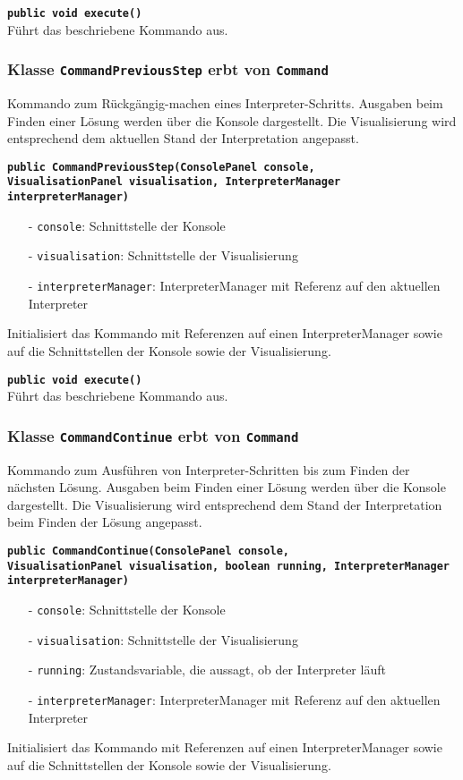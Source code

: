 \documentclass[parskip=full,11pt,twoside]{scrartcl}
\begin{document}
\textbf{\texttt{public void execute()}}\\
Führt das beschriebene Kommando aus.

\subsubsection{Klasse \texttt{CommandPreviousStep} erbt von \texttt{Command}}

Kommando zum Rückgängig-machen eines Interpreter-Schritts. Ausgaben beim Finden einer Lösung werden über die Konsole dargestellt. Die Visualisierung wird entsprechend dem aktuellen Stand der Interpretation angepasst.

\textbf{\texttt{public CommandPreviousStep(ConsolePanel console,\\VisualisationPanel visualisation, InterpreterManager interpreterManager)}}
\begin{itemize}[noitemsep]
	\item[-] \texttt{console}: Schnittstelle der Konsole
	\item[-] \texttt{visualisation}: Schnittstelle der Visualisierung
	\item[-] \texttt{interpreterManager}: InterpreterManager mit Referenz auf den aktuellen Interpreter
\end{itemize}
Initialisiert das Kommando mit Referenzen auf einen InterpreterManager sowie auf die Schnittstellen der Konsole sowie der Visualisierung.

\textbf{\texttt{public void execute()}}\\
Führt das beschriebene Kommando aus.

\subsubsection{Klasse \texttt{CommandContinue} erbt von \texttt{Command}}

Kommando zum Ausführen von Interpreter-Schritten bis zum Finden der nächsten Lösung. Ausgaben beim Finden einer Lösung werden über die Konsole dargestellt. Die Visualisierung wird entsprechend dem Stand der Interpretation beim Finden der Lösung angepasst.

\textbf{\texttt{public CommandContinue(ConsolePanel console,\\VisualisationPanel visualisation, boolean running, InterpreterManager interpreterManager)}}
\begin{itemize}[noitemsep]
	\item[-] \texttt{console}: Schnittstelle der Konsole
	\item[-] \texttt{visualisation}: Schnittstelle der Visualisierung
    \item[-] \texttt{running}: Zustandsvariable, die aussagt, ob der Interpreter läuft
	\item[-] \texttt{interpreterManager}: InterpreterManager mit Referenz auf den aktuellen Interpreter
\end{itemize}
Initialisiert das Kommando mit Referenzen auf einen InterpreterManager sowie auf die Schnittstellen der Konsole sowie der Visualisierung.
\end{document}
